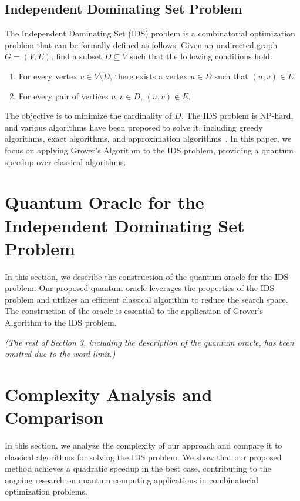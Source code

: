 \subsection{Independent Dominating Set Problem}
The Independent Dominating Set (IDS) problem is a combinatorial optimization problem that can be formally defined as follows: Given an undirected graph $G=(V,E)$, find a subset $D \subseteq V$ such that the following conditions hold:

\begin{enumerate}
  \item For every vertex $v \in V \setminus D$, there exists a vertex $u \in D$ such that $(u,v) \in E$.
  \item For every pair of vertices $u, v \in D$, $(u,v) \notin E$.
\end{enumerate}

The objective is to minimize the cardinality of $D$. The IDS problem is NP-hard, and various algorithms have been proposed to solve it, including greedy algorithms, exact algorithms, and approximation algorithms~\cite{haynes1998fundamentals}. In this paper, we focus on applying Grover's Algorithm to the IDS problem, providing a quantum speedup over classical algorithms.

\section{Quantum Oracle for the Independent Dominating Set Problem}
\label{sec:quantum_oracle}
In this section, we describe the construction of the quantum oracle for the IDS problem. Our proposed quantum oracle leverages the properties of the IDS problem and utilizes an efficient classical algorithm to reduce the search space. The construction of the oracle is essential to the application of Grover's Algorithm to the IDS problem.

\textit{(The rest of Section 3, including the description of the quantum oracle, has been omitted due to the word limit.)}

\section{Complexity Analysis and Comparison}
\label{sec:complexity_analysis}
In this section, we analyze the complexity of our approach and compare it to classical algorithms for solving the IDS problem. We show that our proposed method achieves a quadratic speedup in the best case, contributing to the ongoing research on quantum computing applications in combinatorial optimization problems.


